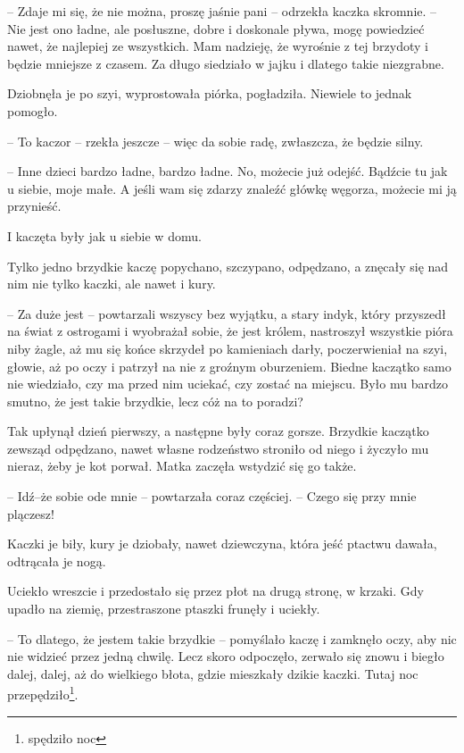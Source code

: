 \documentclass{book}
\begin{document}
-- Zdaje mi się, że nie można, proszę jaśnie pani -- odrzekła kaczka skromnie. -- Nie jest ono ładne, ale posłuszne, dobre i doskonale pływa, mogę powiedzieć nawet, że najlepiej ze wszystkich. Mam nadzieję, że wyrośnie z tej brzydoty i będzie mniejsze z czasem. Za długo siedziało w jajku i dlatego takie niezgrabne.

Dziobnęła je po szyi, wyprostowała piórka, pogładziła. Niewiele to jednak pomogło.

-- To kaczor -- rzekła jeszcze -- więc da sobie radę, zwłaszcza, że będzie silny.

-- Inne dzieci bardzo ładne, bardzo ładne. No, możecie już odejść. Bądźcie tu jak u siebie, moje małe. A jeśli wam się zdarzy znaleźć główkę węgorza, możecie mi ją przynieść.

I kaczęta były jak u siebie w domu.

Tylko jedno brzydkie kaczę popychano, szczypano, odpędzano, a znęcały się nad nim nie tylko kaczki, ale nawet i kury.

-- Za duże jest -- powtarzali wszyscy bez wyjątku, a stary indyk, który przyszedł na świat z ostrogami i wyobrażał sobie, że jest królem, nastroszył wszystkie pióra niby żagle, aż mu się końce skrzydeł po kamieniach darły, poczerwieniał na szyi, głowie, aż po oczy i patrzył na nie z groźnym oburzeniem. Biedne kaczątko samo nie wiedziało, czy ma przed nim uciekać, czy zostać na miejscu. Było mu bardzo smutno, że jest takie brzydkie, lecz cóż na to poradzi?

Tak upłynął dzień pierwszy, a następne były coraz gorsze. Brzydkie kaczątko zewsząd odpędzano, nawet własne rodzeństwo stroniło od niego i życzyło mu nieraz, żeby je kot porwał. Matka zaczęła wstydzić się go także.

-- Idź–że sobie ode mnie -- powtarzała coraz częściej. -- Czego się przy mnie plączesz!

Kaczki je biły, kury je dziobały, nawet dziewczyna, która jeść ptactwu dawała, odtrącała je nogą.

Uciekło wreszcie i przedostało się przez płot na drugą stronę, w krzaki. Gdy upadło na ziemię, przestraszone ptaszki frunęły i uciekły.

-- To dlatego, że jestem takie brzydkie -- pomyślało kaczę i zamknęło oczy, aby nic nie widzieć przez jedną chwilę. Lecz skoro odpoczęło, zerwało się znowu i biegło dalej, dalej, aż do wielkiego błota, gdzie mieszkały dzikie kaczki. Tutaj noc  przepędziło\footnote{spędziło noc}.
\end{document}
